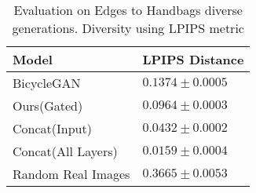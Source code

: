 \begin{table}[ht]
\caption{Evaluation on Edges to Handbags diverse generations. Diversity using LPIPS metric \cite{zhang2018unreasonable}} %
\small
\centering %
\begin{tabular}{p{3cm}p{3cm}} %
\toprule
\textbf{Model} & \textbf{LPIPS Distance} \\%
\midrule
BicycleGAN \cite{zhu2017toward} & $0.1374 \pm 0.0005$  \\ %
\midrule
Ours(Gated) & $0.0964 \pm 0.0003$  \\
\midrule
Concat(Input) &  $0.0432 \pm 0.0002$ \\
\midrule
Concat(All Layers) & $0.0159 \pm 0.0004$ \\
\midrule
Random Real Images & $0.3665 \pm 0.0053$ \\
\bottomrule %
\end{tabular}
\label{table:infogan_lpips} %
\end{table}





